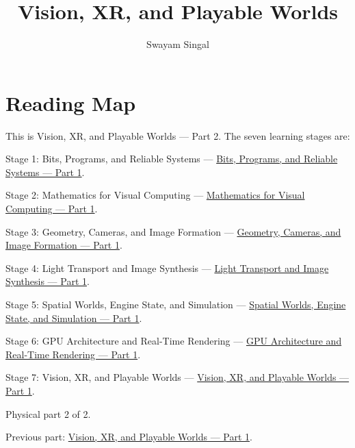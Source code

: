 \documentclass[11pt,twoside,openany]{book}
\title{Vision, XR, and Playable Worlds}
\author{Swayam Singal}
\begin{document}
\maketitle
\begin{center}\end{center}
\chapter*{Reading Map}
\hypertarget{volume-reading-map}{}
\noindent This is Vision, XR, and Playable Worlds --- Part 2. The seven learning stages are:
\par\noindent Stage 1: Bits, Programs, and Reliable Systems --- \href{../01-Bits-Programs-and-Reliable-Systems-P01/main.pdf}{Bits, Programs, and Reliable Systems — Part 1}.
\par\noindent Stage 2: Mathematics for Visual Computing --- \href{../02-Mathematics-for-Visual-Computing-P01/main.pdf}{Mathematics for Visual Computing — Part 1}.
\par\noindent Stage 3: Geometry, Cameras, and Image Formation --- \href{../03-Geometry-Cameras-and-Image-Formation-P01/main.pdf}{Geometry, Cameras, and Image Formation — Part 1}.
\par\noindent Stage 4: Light Transport and Image Synthesis --- \href{../04-Light-Transport-and-Image-Synthesis-P01/main.pdf}{Light Transport and Image Synthesis — Part 1}.
\par\noindent Stage 5: Spatial Worlds, Engine State, and Simulation --- \href{../05-Spatial-Worlds-Engine-State-and-Simulation-P01/main.pdf}{Spatial Worlds, Engine State, and Simulation — Part 1}.
\par\noindent Stage 6: GPU Architecture and Real-Time Rendering --- \href{../06-GPU-Architecture-and-Real-Time-Rendering-P01/main.pdf}{GPU Architecture and Real-Time Rendering — Part 1}.
\par\noindent Stage 7: Vision, XR, and Playable Worlds --- \href{../07-Vision-XR-and-Playable-Worlds-P01/main.pdf}{Vision, XR, and Playable Worlds — Part 1}.
\par\noindent Physical part 2 of 2.
\par\noindent Previous part: \href{../07-Vision-XR-and-Playable-Worlds-P01/main.pdf}{Vision, XR, and Playable Worlds — Part 1}.
\tableofcontents
\mainmatter
\setcounter{chapter}{8}


\end{document}
